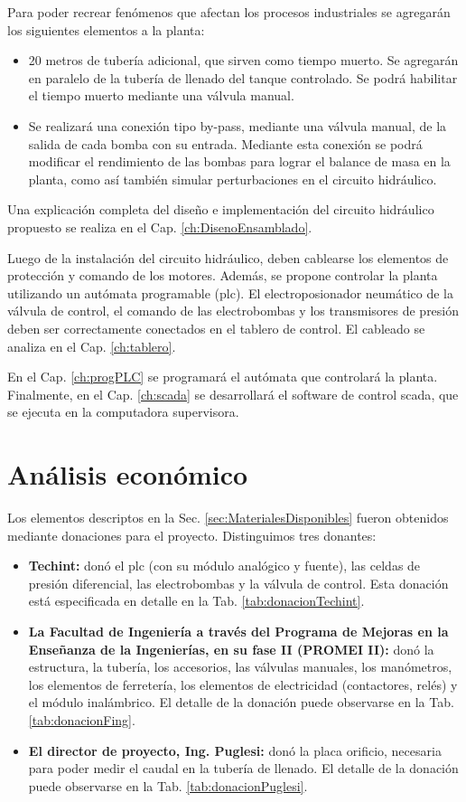 Para poder recrear fenómenos que afectan los procesos industriales se agregarán
los siguientes elementos a la planta:
\begin{itemize}
\item 20 metros de tubería adicional, que sirven como tiempo
muerto.
Se agregarán en paralelo de la tubería de llenado del tanque controlado.
Se podrá habilitar el tiempo muerto mediante una válvula manual.

\item Se realizará una conexión tipo by-pass, mediante una válvula manual, de
la salida de
cada bomba con su entrada. Mediante esta conexión se podrá modificar el
rendimiento de las bombas para lograr el balance de masa en la planta, como así
también simular perturbaciones en el circuito hidráulico.

\end{itemize}

Una explicación completa del diseño e implementación del circuito hidráulico
propuesto se realiza en el Cap. \ref{ch:DisenoEnsamblado}.

Luego de la instalación del circuito hidráulico, deben cablearse los elementos
de protección y comando de los motores.
Además, se propone controlar la planta utilizando un autómata
programable (\gls{plc}).
El electroposionador neumático de la válvula de control, el comando de las
electrobombas y los transmisores de presión
deben ser correctamente conectados en el tablero de control.
El cableado se analiza en el Cap. \ref{ch:tablero}.

En el Cap. \ref{ch:progPLC} se programará el autómata que controlará la
planta. Finalmente, en el Cap. \ref{ch:scada} se desarrollará el software
de control \gls{scada}, que se ejecuta en la computadora supervisora.

\section{Análisis económico}
\label{sec:AnalisisEconomico}
Los elementos descriptos en la Sec. \ref{sec:MaterialesDisponibles} fueron
obtenidos mediante donaciones para el proyecto.
Distinguimos tres donantes:
\begin{itemize}
 \item \textbf{Techint:} donó el \gls{plc} (con su módulo analógico y fuente),
las celdas de presión diferencial, las electrobombas y la válvula de control.
Esta donación está especificada en detalle en la Tab.
\ref{tab:donacionTechint}.
 \item \textbf{La Facultad de Ingeniería a través del Programa de Mejoras en la
Enseñanza de la Ingenierías, en su fase II (PROMEI II):} donó la estructura,
la tubería, los
accesorios, las válvulas manuales, los manómetros, los elementos de ferretería,
los elementos de electricidad (contactores, relés) y el módulo inalámbrico.
El detalle de la donación puede observarse en la Tab. \ref{tab:donacionFing}.
\item \textbf{El director de proyecto, Ing. Puglesi:} donó la placa orificio,
necesaria para poder medir el caudal en la tubería de llenado.
El detalle de la donación puede observarse en la Tab.
\ref{tab:donacionPuglesi}.
\end{itemize}


